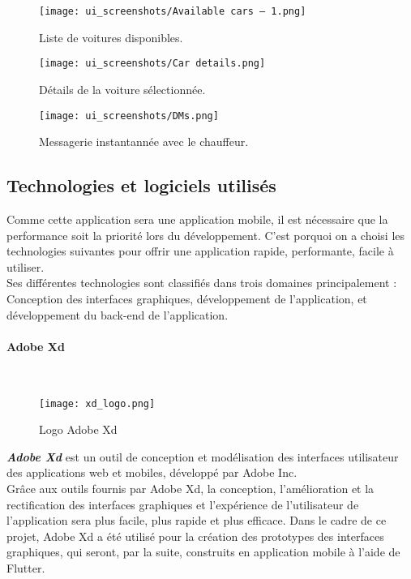 \newpage
\begin{multicols}{2}
    \begin{figure}[H]
        \centering
        \texttt{[image: ui\_screenshots/Available cars – 1.png]}
        \vspace{1cm}
        \caption{\centering Liste de voitures disponibles.}
        \label{fig:available_cars}
    \end{figure}
    \begin{figure}[H]
        \centering
        \texttt{[image: ui\_screenshots/Car details.png]}
        \vspace{1cm}
        \caption{\centering Détails de la voiture sélectionnée.}
        \label{fig:car_details}
    \end{figure}
\end{multicols}
\vspace{1cm}
\begin{figure}[H]
    \centering
    \texttt{[image: ui\_screenshots/DMs.png]}
    \vspace{1cm}
    \caption{\centering Messagerie instantannée avec le chauffeur.}
    \label{fig:dms}
\end{figure}

\subsection{Technologies et logiciels utilisés}
Comme cette application sera une application mobile, il est nécessaire que la performance soit la priorité lors du développement. C'est porquoi on a choisi les technologies suivantes pour offrir une application rapide, performante, facile à utiliser.\\
\noindent Ses différentes technologies sont classifiés dans trois domaines principalement : Conception des interfaces graphiques, développement de l'application, et développement du back-end de l'application.\\
\paragraph{Adobe Xd}\mbox{} \\
\vspace{1cm}
\begin{figure}[H]
    \centering
    \texttt{[image: xd\_logo.png]}
    \vspace{1cm}
    \caption{Logo Adobe Xd}
    \label{fig:xd_logo}
\end{figure}
\textit{\textbf{Adobe Xd}} est un outil de conception et modélisation des interfaces utilisateur des applications web et mobiles, développé par Adobe Inc.\\
\noindent Grâce aux outils fournis par Adobe Xd, la conception, l'amélioration et la rectification des interfaces graphiques et l'expérience de l'utilisateur de l'application sera plus facile, plus rapide et plus efficace.
\noindent Dans le cadre de ce projet, Adobe Xd a été utilisé pour la création des prototypes des interfaces graphiques, qui seront, par la suite, construits en application mobile à l'aide de Flutter.
